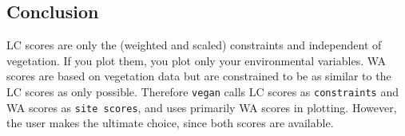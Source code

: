 \documentclass[a4paper,10pt]{amsart}
\begin{document}
\subsection{Conclusion}

LC scores are only the (weighted and scaled) constraints and
independent of vegetation. If you plot them, you plot only your
environmental variables. WA scores are based on vegetation data but
are constrained to be as similar to the LC scores as only
possible. Therefore \texttt{vegan} calls LC scores as
\texttt{constraints} and WA scores as \texttt{site scores}, and uses
primarily WA scores in plotting.  However, the user makes the ultimate
choice, since both scores are available.




\end{document}
